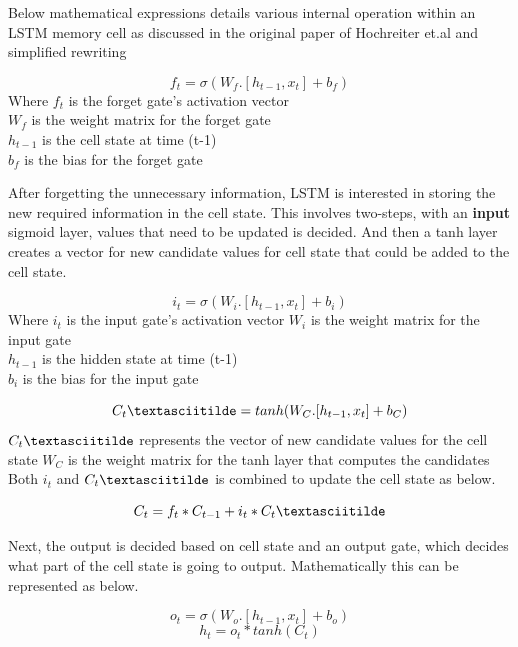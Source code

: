 Below mathematical expressions details various internal operation within an LSTM memory cell as discussed in the original paper of Hochreiter et.al \cite{hochreiter1997long} and simplified rewriting \cite{christopherolah}

\begin{equation}
f_t = \sigma(W_f. [h_{t-1}, x_t  ] + b_f)
\end{equation}
Where $f_t$ is the forget gate's activation vector \\
$W_f$ is the weight matrix for the forget gate \\
$h_{t-1}$ is the cell state at time (t-1) \\
$b_f$ is the bias for the forget gate

After forgetting the unnecessary information, LSTM is interested in storing the new required information in the cell state. This involves two-steps, with an \textbf{input} sigmoid layer, values that need to be updated is decided. And then a tanh layer creates a vector for new candidate values for cell state that could be added to the cell state. 

\begin{equation}
i_t = \sigma(W_i. [h_{t-1}, x_t  ] + b_i)
\end{equation}
Where $i_t$ is the input gate's activation vector 
$W_i$ is the weight matrix for the input gate \\
$h_{t-1}$ is the hidden state at time (t-1) \\
$b_i$ is the bias for the input gate

\begin{equation}
C_t\textasciitilde = tanh(W_C. [h_{t-1}, x_t ] + b_C)
\end{equation}
$C_t\textasciitilde$ represents the vector of new candidate values for the cell state
$W_C$ is the weight matrix for the tanh layer that computes the candidates\\
Both $i_t$ and $C_t\textasciitilde$ is combined to update the cell state as below.

\begin{equation} \label{cell-state}
C_t = f_t * C_{t-1} + i_t * C_t\textasciitilde
\end{equation}

Next, the output is decided based on cell state and an output gate, which decides what part of the cell state is going to output. Mathematically this can be represented as below.

\begin{equation}
o_t = \sigma(W_o. [h_{t-1}, x_t  ] + b_o)
\end{equation}
\begin{equation}
h_t = o_t  * tanh(C_t)
\end{equation}

